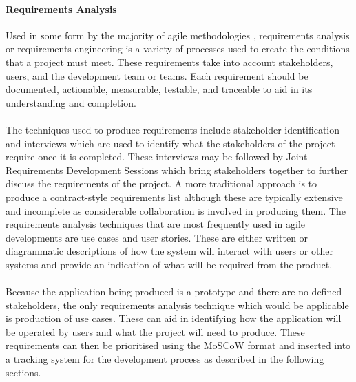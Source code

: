 		\paragraph{Requirements Analysis}
			Used in some form by the majority of agile methodologies \citep{cao2008agile}, requirements analysis or requirements engineering is a variety of processes used to create the conditions that a project must meet. These requirements take into account stakeholders, users, and the development team or teams. Each requirement should be documented, actionable, measurable, testable, and traceable to aid in its understanding and completion.
			\\\\
			The techniques used to produce requirements include stakeholder identification and interviews which are used to identify what the stakeholders of the project require once it is completed. These interviews may be followed by Joint Requirements Development Sessions which bring stakeholders together to further discuss the requirements of the project. A more traditional approach is to produce a contract-style requirements list although these are typically extensive and incomplete as considerable collaboration is involved in producing them. The requirements analysis techniques that are most frequently used in agile developments are use cases and user stories. These are either written or diagrammatic descriptions of how the system will interact with users or other systems and provide an indication of what will be required from the product.
			\\\\
			Because the application being produced is a prototype and there are no defined stakeholders, the only requirements analysis technique which would be applicable is production of use cases. These can aid in identifying how the application will be operated by users and what the project will need to produce. These requirements can then be prioritised using the MoSCoW format and inserted into a tracking system for the development process as described in the following sections.
